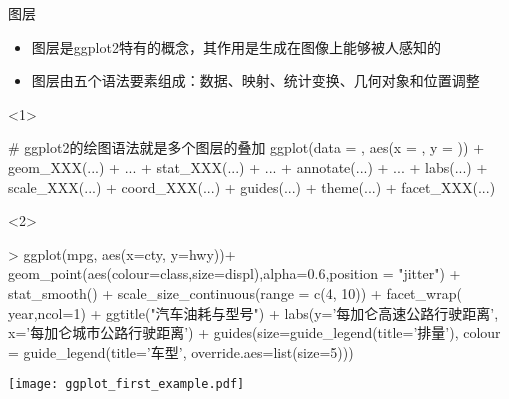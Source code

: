 \begin{frame}[t,fragile]{\subsecname}{图层}
\begin{itemize}
\item 图层是ggplot2特有的概念，其作用是生成在图像上能够被人感知的
\item 图层由五个语法要素组成：数据、映射、统计变换、几何对象和位置调整
\end{itemize}

\begin{overlayarea}{\textwidth}{\textheight}
\begin{onlyenv}<1>
\begin{rcode}
# ggplot2的绘图语法就是多个图层的叠加 
ggplot(data = , aes(x = , y = )) + geom_XXX(...) + ... + stat_XXX(...) + ... + annotate(...) + ... + labs(...) + scale_XXX(...) + coord_XXX(...) + guides(...) + theme(...) + facet_XXX(...)
\end{rcode}
\end{onlyenv}

\begin{onlyenv}<2>
\begin{minipage}{\textwidth}
\begin{rcode}
> ggplot(mpg, aes(x=cty, y=hwy))+   
  geom_point(aes(colour=class,size=displ),alpha=0.6,position = "jitter") +  
  stat_smooth() +  
  scale_size_continuous(range = c(4, 10)) +  
  facet_wrap(~ year,ncol=1) +  
  ggtitle("汽车油耗与型号") +  
  labs(y='每加仑高速公路行驶距离', x='每加仑城市公路行驶距离') +  
  guides(size=guide_legend(title='排量'), colour = guide_legend(title='车型', override.aes=list(size=5))) 
\end{rcode} 
\end{minipage}

\begin{minipage}{\textwidth}
\centering
\texttt{[image: ggplot\_first\_example.pdf]}
\end{minipage}
\end{onlyenv}
\end{overlayarea}
\end{frame}


